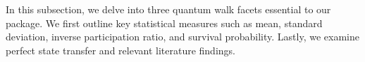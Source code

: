 \documentclass[main.tex]{subfiles}
\begin{document}
In this subsection, we delve into three quantum walk facets essential to our
package. We first outline key statistical measures such as mean, standard
deviation, inverse participation ratio, and survival probability.  Lastly, we
examine perfect state transfer and relevant literature findings.
\end{document}
